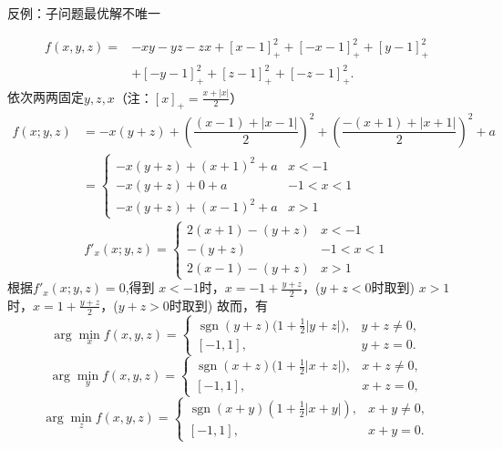 \begin{example}
    反例：子问题最优解不唯一
    \begin{solution}
        \[
            \begin{aligned}
                f(x,y,z)=&-xy-yz-zx+[x-1]_{+}^{2}+[-x-1]_{+}^{2}+[y-1]_{+}^{2}\\
                &+[-y-1]_{+}^{2}+[z-1]_{+}^{2}+[-z-1]_{+}^{2}.
            \end{aligned}
        \]
        依次两两固定$y,z,x$\colorbox{cyan!50}{（注：$[x]_{+} = \frac{x+|x|}{2}$）}
        \[
            \begin{aligned}
                f(x;y,z) &= -x(y+z)+\left( \dfrac{(x-1)+|x-1|}{2} \right)^2+\left( \dfrac{-(x+1)+|x+1|}{2} \right)^2 + a \\
                &=\begin{cases}
                    -x(y+z)+(x+1)^2+a & x<-1 \\
                    -x(y+z)+0+a & -1<x<1 \\
                    -x(y+z)+ (x-1)^2+a & x>1
                \end{cases}
            \end{aligned}
        \]
        \[
            f'_x(x;y,z) =\begin{cases}
                2(x+1)-(y+z) & x<-1 \\
                -(y+z)& -1<x<1 \\
                2(x-1)-(y+z) & x>1
            \end{cases}
        \]
        根据$f'_x(x;y,z) = 0$,得到
        \newline
        $x<-1$时，$x = -1+\frac{y+z}{2}$，(\colorbox{cyan!50}{$y+z<0$时取到})
        \newline
        $x>1$时，$x = 1+\frac{y+z}{2}$，(\colorbox{cyan!50}{$y+z>0$时取到})
        故而，有
        \[
            \arg\min_xf(x,y,z)=
            \begin{cases}
                \operatorname{sgn}(y+z)\big(1+\frac{1}{2}|y+z|\big),&y+z\neq0,\\
                [-1,1],&y+z=0.
            \end{cases}
        \]
        \[
            \arg\min\limits_{y}f(x,y,z)=
            \begin{cases}
                \operatorname{sgn}(x+z)\big(1+\frac{1}{2}|x+z|\big),&x+z\neq0,\\
                [-1,1],&x+z=0,
            \end{cases}
        \]
        \[
            \arg\min_zf(x,y,z)=
            \begin{cases}
                \operatorname{sgn}(x+y)(1+\frac{1}{2}|x+y|),&x+y\neq0,\\
                [-1,1],&x+y=0.
            \end{cases}    
        \]
    \end{solution}
\end{example}
